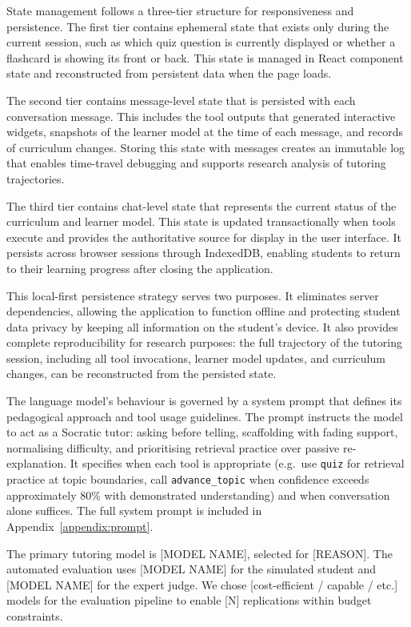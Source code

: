 \documentclass[logo,bsc,singlespacing,parskip,online]{infthesis}
\begin{document}
State management follows a three-tier structure for responsiveness and persistence. The first tier contains ephemeral state that exists only during the current session, such as which quiz question is currently displayed or whether a flashcard is showing its front or back. This state is managed in React component state and reconstructed from persistent data when the page loads.

The second tier contains message-level state that is persisted with each conversation message. This includes the tool outputs that generated interactive widgets, snapshots of the learner model at the time of each message, and records of curriculum changes. Storing this state with messages creates an immutable log that enables time-travel debugging and supports research analysis of tutoring trajectories.

The third tier contains chat-level state that represents the current status of the curriculum and learner model. This state is updated transactionally when tools execute and provides the authoritative source for display in the user interface. It persists across browser sessions through IndexedDB, enabling students to return to their learning progress after closing the application.

This local-first persistence strategy serves two purposes. It eliminates server dependencies, allowing the application to function offline and protecting student data privacy by keeping all information on the student's device. It also provides complete reproducibility for research purposes: the full trajectory of the tutoring session, including all tool invocations, learner model updates, and curriculum changes, can be reconstructed from the persisted state.

The language model's behaviour is governed by a system prompt that defines its pedagogical approach and tool usage guidelines. The prompt instructs the model to act as a Socratic tutor: asking before telling, scaffolding with fading support, normalising difficulty, and prioritising retrieval practice over passive re-explanation. It specifies when each tool is appropriate (e.g.\ use \texttt{quiz} for retrieval practice at topic boundaries, call \texttt{advance\_topic} when confidence exceeds approximately 80\% with demonstrated understanding) and when conversation alone suffices. The full system prompt is included in Appendix~\ref{appendix:prompt}.

The primary tutoring model is [MODEL NAME], selected for [REASON]. The automated evaluation uses [MODEL NAME] for the simulated student and [MODEL NAME] for the expert judge. We chose [cost-efficient / capable / etc.] models for the evaluation pipeline to enable [N] replications within budget constraints.
\end{document}
